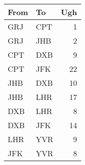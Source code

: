 \documentclass[11pt]{article}
\begin{document}
\begin{center}
\begin{tabular}{llr}
From & To & Ugh\\
\hline
GRJ & CPT & 1\\
GRJ & JHB & 2\\
CPT & DXB & 9\\
CPT & JFK & 22\\
JHB & DXB & 10\\
JHB & LHR & 17\\
DXB & LHR & 8\\
DXB & JFK & 14\\
LHR & YVR & 9\\
JFK & YVR & 8\\
\end{tabular}
\end{center}
\end{document}
